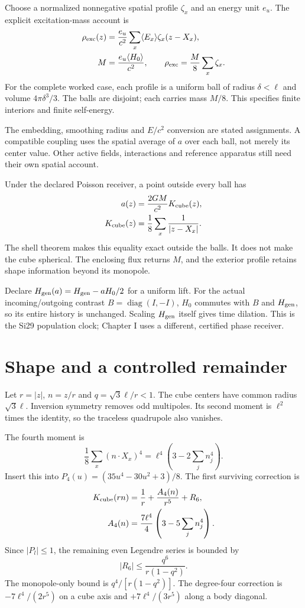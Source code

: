 \documentclass[10pt,twocolumn,letterpaper]{article}
\begin{document}
Choose a normalized nonnegative spatial profile $\zeta_x$ and an energy unit $e_u$. The explicit excitation-mass account is
\[
\begin{aligned}
\rho_{\rm exc}(z)&=\frac{e_u}{c^2}\sum_x\langle E_x\rangle\zeta_x(z-X_x),\\
M&=\frac{e_u\langle H_0\rangle}{c^2},\qquad
\rho_{\rm exc}=\frac M8\sum_x\zeta_x.
\end{aligned}
\]
For the complete worked case, each profile is a uniform ball of radius $\delta<\ell$ and volume $4\pi\delta^3/3$. The balls are disjoint; each carries mass $M/8$. This specifies finite interiors and finite self-energy.

The embedding, smoothing radius and $E/c^2$ conversion are stated assignments. A compatible coupling uses the spatial average of $a$ over each ball, not merely its center value. Other active fields, interactions and reference apparatus still need their own spatial account.

Under the declared Poisson receiver, a point outside every ball has
\[
\begin{aligned}
a(z)&=\frac{2GM}{c^2}K_{\rm cube}(z),\\
K_{\rm cube}(z)&=\frac18\sum_x\frac1{|z-X_x|}.
\end{aligned}
\]
The shell theorem makes this equality exact outside the balls. It does not make the cube spherical. The enclosing flux returns $M$, and the exterior profile retains shape information beyond its monopole.

Declare $H_{\rm gen}(a)=H_{\rm gen}-aH_0/2$ for a uniform lift. For the actual incoming/outgoing contrast $B=\operatorname{diag}(I,-I)$, $H_0$ commutes with $B$ and $H_{\rm gen}$, so its entire history is unchanged. Scaling $H_{\rm gen}$ itself gives time dilation. This is the Si29 population clock; Chapter I uses a different, certified phase receiver.

\section{Shape and a controlled remainder}
Let $r=|z|$, $n=z/r$ and $q=\sqrt3\ell/r<1$. The cube centers have common radius $\sqrt3\ell$. Inversion symmetry removes odd multipoles. Its second moment is $\ell^2$ times the identity, so the traceless quadrupole also vanishes.

The fourth moment is
\[
\frac18\sum_x(n\cdot X_x)^4=\ell^4\left(3-2\sum_j n_j^4\right).
\]
Insert this into $P_4(u)=(35u^4-30u^2+3)/8$. The first surviving correction is
\[
\begin{aligned}
K_{\rm cube}(rn)&=\frac1r+\frac{A_4(n)}{r^5}+R_6,\\
A_4(n)&=\frac{7\ell^4}{4}\left(3-5\sum_j n_j^4\right).
\end{aligned}
\]
Since $|P_l|\leq1$, the remaining even Legendre series is bounded by
\[
|R_6|\leq\frac{q^6}{r(1-q^2)}.
\]
The monopole-only bound is $q^4/[r(1-q^2)]$. The degree-four correction is $-7\ell^4/(2r^5)$ on a cube axis and $+7\ell^4/(3r^5)$ along a body diagonal.
\end{document}
